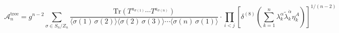 \documentclass[a4paper,9pt]{article}
\begin{document}
\[
\mathcal{A}_{n}^{\text{tree}} = g^{n-2}\sum_{\sigma\in S_n/Z_n}\frac{\mathrm{Tr}(T^{a_{\sigma(1)}}\cdots T^{a_{\sigma(n)}})}{\langle\sigma(1)\,\sigma(2)\rangle\langle\sigma(2)\,\sigma(3)\rangle\cdots\langle\sigma(n)\,\sigma(1)\rangle}\cdot\prod_{i<j}\left[\delta^{(8)}\!\left(\sum_{k=1}^{n}\lambda_k^{\alpha}\tilde{\lambda}_k^{\dot{\alpha}}\eta_k^A\right)\right]^{1/(n-2)}
\]
\end{document}
